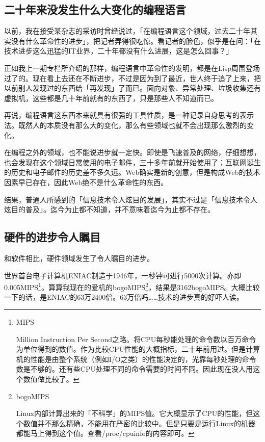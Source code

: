 \documentclass[a4paper,12pt]{article}
\begin{document}
\subsection{二十年来没发生什么大变化的编程语言}

以前，我在接受某杂志的采访时曾经说过，「在编程语言这个领域，过去二十年其实没有什么革命性的进步」，把记者弄得很吃惊。看记者的脸色，似乎是在问：「在技术进步这么迅猛的IT业界，二十年都没有什么进展，这是怎么回事？」

正如我上一期专栏所介绍的那样，编程语言中革命性的发明，都是在Lisp周围登场过了的。现在看上去还在不断进步，不过是因为到了最近，世人终于追了上来，把以前别人发现过的东西给「再发现」了而已。面向对象、异常处理、垃圾收集还有虚拟机，这些都是几十年前就有的东西了，只是那些人不知道而已。

再说，编程语言这东西本来就具有很强的工具性质，是一种记录自身思考的表示法。既然人的本质没有那么大的变化，那么有些领域也就不会出现那么激烈的变化。

在编程之外的领域，也不能说进步就一定快。即使是飞速普及的网络，仔细想想，也会发现在这个领域日常使用的电子邮件，三十多年前就开始使用了；互联网诞生的历史和电子邮件的历史差不多久远。Web确实是新的创意，但是构成Web的技术因素早已存在，因此Web绝不是什么革命性的东西。

结果，普通人所感到的「信息技术令人炫目的发展」，其实不过是「信息技术令人炫目的普及」。迄今为止都不知道，并不意味着迄今为止都不存在。

\subsection{硬件的进步令人瞩目}

和软件相比，硬件领域发生了令人瞩目的进步。

世界首台电子计算机ENIAC制造于1946年，一秒钟可进行5000次计算。亦即0.005MIPS\footnote{MIPS

  Million Instruction Per Second之略。将CPU每秒能处理的命令数以百万命令为单位得到的数值。作为比较CPU性能的大概指标，二十年前用过。但是计算机的性能是由整个系统（例如I/O之类）的性能决定的，光靠每秒处理的命令数是不够的。还有些CPU处理不同的命令需要的时间不同。因此现在没人用这个数值做比较了。}。算算我现在的爱机的bogoMIPS\footnote{bogoMIPS

Linux内部计算出来的「不科学」的MIPS值。它大概显示了CPU的性能，但这个数值并不那么精确，不能用在严密的比较中。但是只要是运行Linux的机器都能马上得到这个值。查看/proc/cpuinfo的内容即可。}，结果是3162bogoMIPS。大概比较一下的话，是ENIAC的63万2400倍。63万倍吗……技术的进步真的好吓人诶。
\end{document}
